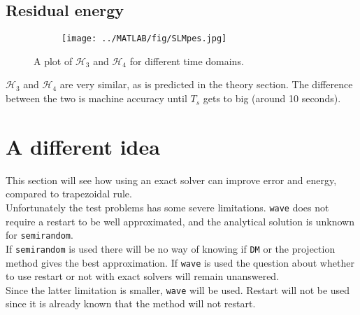 \subsection{Residual energy}%
\label{sec:residualenergy}
\begin{figure}[H]
        \centering
        \begin{subfigure}[b]{0.45\textwidth}
                \texttt{[image: ../MATLAB/fig/SLMpes.jpg]}
        \end{subfigure}
		
        \caption{ A plot of $\mathcal{H}_3$ and $\mathcal{H}_4$ for different time domains. }
        \label{fig:SLMpes}
\end{figure}
$\mathcal{H}_3$ and $\mathcal{H}_4$ are very similar, as is predicted in the theory section. The difference between the two is machine accuracy until $T_s$ gets to big (around 10 seconds). \\
\section{A different idea} %
\label{sec:diag}
This section will see how using an exact solver can improve error and energy, compared to trapezoidal rule.\\
Unfortunately the test problems has some severe limitations. \texttt{wave} does not require a restart to be well approximated, and the analytical solution is unknown for \texttt{semirandom}. \\
If \texttt{semirandom} is used there will be no way of knowing if \texttt{DM} or the projection method gives the best approximation.
If \texttt{wave} is used the question about whether to use restart or not with exact solvers will remain unanswered. \\
Since the latter limitation is smaller,
\texttt{wave} will be used. Restart will not be used since it is already known that the method will not restart.

